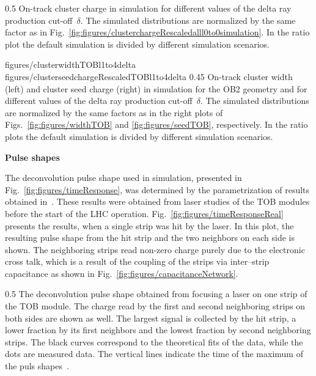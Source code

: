                  {0.5}       %
                 {  On-track cluster charge in simulation for different values of the delta ray production cut-off~$\delta$. The simulated distributions are normalized by the same factor as in Fig.~\ref{fig:figures/clusterchargeRescaledalll0to0simulation}. In the ratio plot the default simulation is divided by different simulation scenarios. }

                 {figures/clusterwidthTOBl1to4delta}
                 {figures/clusterseedchargeRescaledTOBl1to4delta} %
                 {0.45}       %
                 {  On-track cluster width (left) and cluster seed charge (right) in simulation for the OB2 geometry and for different values of the delta ray production cut-off~$\delta$.   The simulated distributions are normalized by the same factors as in the right plots of Figs.~\ref{fig:figures/widthTOB} and \ref{fig:figures/seedTOB}, respectively.  In the ratio plots the default simulation is divided by different simulation scenarios. }

\textbf{Pulse shapes}

The deconvolution pulse shape used in simulation, presented in Fig.~\ref{fig:figures/timeResponse}, was determined by the parametrization of results obtained in~\cite{Delaere:1061284}. These results were obtained from laser studies of the TOB modules before the start of the LHC operation. Fig.~\ref{fig:figures/timeResponseReal} presents the results, when a single strip was hit by the laser. In this plot, the resulting pulse shape from the hit strip and the two neighbors on each side is shown. The neighboring strips read non-zero charge purely due to the electronic cross talk, which is a result of the coupling of the strips via inter--strip capacitance as shown in Fig.~\ref{fig:figures/capacitanceNetwork}. 



                 {0.5}       %
                 { The deconvolution pulse shape obtained from focusing a laser on one strip of the TOB module. The charge read by the first and second neighboring strips on both sides are shown as well. The largest signal is collected by the hit strip, a lower fraction by its first neighbors and the lowest fraction by second neighboring strips. The black curves correspond to the theoretical fits of the data, while the dots are measured data. The vertical lines indicate the time of the maximum of the puls shapes~\cite{Delaere:1061284}.  }

